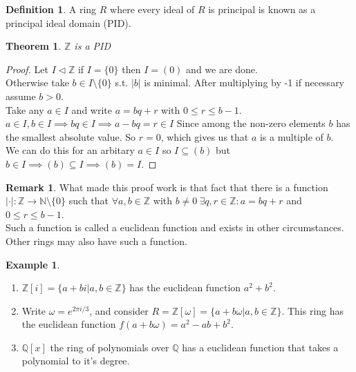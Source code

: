 \documentclass{article}
\newtheorem*{thm}{Theorem}
\theoremstyle{definition}
\newtheorem*{defn}{Definition}
\newtheorem*{ex}{Example}
\newtheorem*{rem}{Remark}
\newcommand{\ZZ}{\mathbb{Z}}
\newcommand{\QQ}{\mathbb{Q}}
\newcommand{\NN}{\mathbb{N}}
\begin{document}
\begin{defn}
A ring $R$ where every ideal of $R$ is principal is known as a principal ideal domain (PID).
\end{defn}
\begin{thm}
$\ZZ$ is a PID
\end{thm}
\begin{proof}
Let $I \triangleleft \ZZ$ if $I=\{0\}$ then $I = (0)$ and we are done. \\
Otherwise take $b \in I\setminus \{0\}$ s.t. $|b|$ is minimal. After multiplying by -1 if necessary assume $b > 0$. \\
Take any $a \in I$ and write $a = bq + r$ with $0 \leq r \leq b-1$. \\
$a \in I, b \in I \implies bq \in I \implies a-bq =r \in I$ Since among the non-zero elements $b$ has the smallest absolute value. So $r=0$, which gives us that $a$ is a multiple of $b$. \\
We can do this for an arbitary $a \in I$ so $I \subseteq (b)$ but $b \in I \implies (b) \subseteq I \implies (b) = I$.
\end{proof}
\begin{rem}
What made this proof work is that fact that there is a function $|\cdot|:\ZZ \rightarrow \NN \setminus\{0\}$ such that $\forall a,b \in \ZZ$ with $b\neq 0\ \exists q,r \in \ZZ: a=bq+r$ and $0 \leq r \leq b-1$. \\
Such a function is called a euclidean function and exists in other circumstances. Other rings may also have such a function.
\end{rem}
\begin{ex}
\begin{enumerate}
\item $\ZZ[i] = \{a+bi|a,b \in \ZZ\}$ has the euclidean function $a^2+b^2$.
\item Write $\omega = e^{2\pi i /3}$, and consider $R = \ZZ[\omega] = \{a+b\omega|a,b\in\ZZ\}$. This ring has the euclidean function $f(a+b\omega) = a^2-ab+b^2$.
\item $\QQ[x]$ the ring of polynomials over $\QQ$ has a euclidean function that takes a polynomial to it's degree.
\end{enumerate}
\end{ex}
\end{document}

